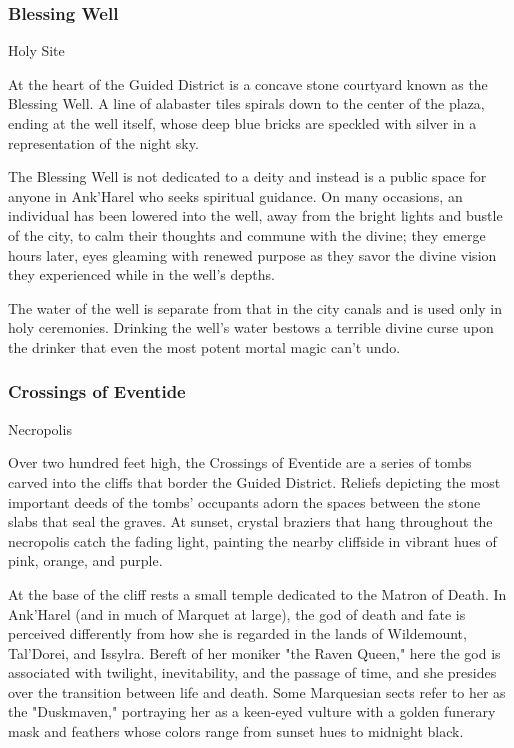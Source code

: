 \documentclass[10pt,a4paper,twoside,bg=print,twocolumn,openany,nodeprecatedcode]{dndbook}
\begin{document}
\subsubsection{Blessing Well}
Holy Site

At the heart of the Guided District is a concave stone courtyard known as the Blessing Well. A line of alabaster tiles spirals down to the center of the plaza, ending at the well itself, whose deep blue bricks are speckled with silver in a representation of the night sky.

The Blessing Well is not dedicated to a deity and instead is a public space for anyone in Ank'Harel who seeks spiritual guidance. On many occasions, an individual has been lowered into the well, away from the bright lights and bustle of the city, to calm their thoughts and commune with the divine; they emerge hours later, eyes gleaming with renewed purpose as they savor the divine vision they experienced while in the well's depths.

The water of the well is separate from that in the city canals and is used only in holy ceremonies. Drinking the well's water bestows a terrible divine curse upon the drinker that even the most potent mortal magic can't undo.

\subsubsection{Crossings of Eventide}
Necropolis

Over two hundred feet high, the Crossings of Eventide are a series of tombs carved into the cliffs that border the Guided District. Reliefs depicting the most important deeds of the tombs' occupants adorn the spaces between the stone slabs that seal the graves. At sunset, crystal braziers that hang throughout the necropolis catch the fading light, painting the nearby cliffside in vibrant hues of pink, orange, and purple.

At the base of the cliff rests a small temple dedicated to the Matron of Death. In Ank'Harel (and in much of Marquet at large), the god of death and fate is perceived differently from how she is regarded in the lands of Wildemount, Tal'Dorei, and Issylra. Bereft of her moniker "the Raven Queen," here the god is associated with twilight, inevitability, and the passage of time, and she presides over the transition between life and death. Some Marquesian sects refer to her as the "Duskmaven," portraying her as a keen-eyed vulture with a golden funerary mask and feathers whose colors range from sunset hues to midnight black.
\end{document}
